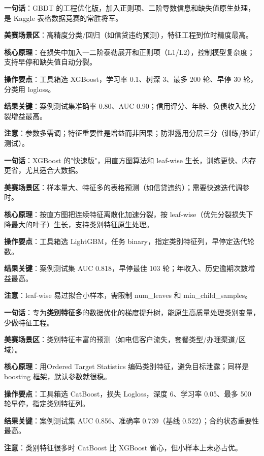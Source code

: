 \begin{algobrief}
\textbf{一句话}：GBDT 的工程优化版，加入正则项、二阶导数信息和缺失值原生处理，是 Kaggle 表格数据竞赛的常胜将军。

\textbf{美赛场景区}：高精度分类/回归（如信贷违约预测），特征工程到位时精度最高。

\textbf{核心原理}：在损失中加入一二阶泰勒展开和正则项（L1/L2），控制模型复杂度；支持早停和缺失值自动分裂。

\textbf{操作要点}：工具箱选 XGBoost，学习率 0.1、树深 3、最多 200 轮、早停 30 轮，分类用 logloss。

\textbf{结果关键}：案例测试集准确率 0.80、AUC 0.90；信用评分、年龄、负债收入比分裂增益最高。

\textbf{注意}：参数多需调；特征重要性是增益而非因果；防泄露用分层三分（训练/验证/测试）。
\end{algobrief}


\begin{algobrief}
\textbf{一句话}：XGBoost 的"快速版"，用直方图算法和 leaf-wise 生长，训练更快、内存更省，尤其适合大数据。

\textbf{美赛场景区}：样本量大、特征多的表格预测（如信贷违约）；需要快速迭代调参时。

\textbf{核心原理}：按直方图把连续特征离散化加速分裂，按 leaf-wise（优先分裂损失下降最大的叶子）生长，支持类别特征原生处理。

\textbf{操作要点}：工具箱选 LightGBM，任务 binary，指定类别特征列，早停定迭代轮数。

\textbf{结果关键}：案例测试集 AUC 0.818，早停最佳 103 轮；年收入、历史逾期次数增益最高。

\textbf{注意}：leaf-wise 易过拟合小样本，需限制 num\_leaves 和 min\_child\_samples。
\end{algobrief}


\begin{algobrief}
\textbf{一句话}：专为\textbf{类别特征多}的数据优化的梯度提升树，能原生高质量处理类别变量，少做特征工程。

\textbf{美赛场景区}：类别特征丰富的预测（如电信客户流失，套餐类型/办理渠道/区域）。

\textbf{核心原理}：用Ordered Target Statistics 编码类别特征，避免目标泄露；同样是 boosting 框架，默认参数就很稳。

\textbf{操作要点}：工具箱选 CatBoost，损失 Logloss，深度 6、学习率 0.05、最多 500 轮早停，指定类别特征列。

\textbf{结果关键}：案例测试集 AUC 0.856、准确率 0.739（基线 0.522）；合约状态重要性最高。

\textbf{注意}：类别特征很多时 CatBoost 比 XGBoost 省心，但小样本上未必占优。
\end{algobrief}

